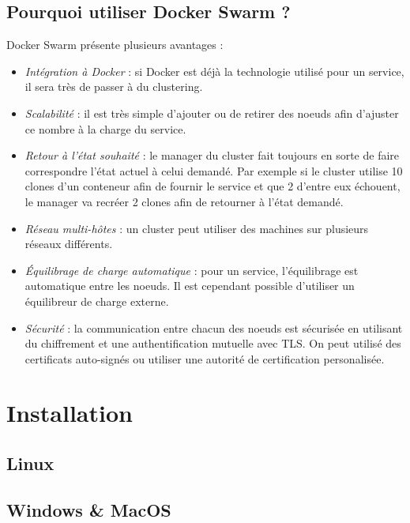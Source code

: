 \section{Pourquoi utiliser Docker Swarm ?}

Docker Swarm présente plusieurs avantages :
\begin{itemize}
    \item \emph{Intégration à Docker} : si Docker est déjà la technologie utilisé pour un service,
        il sera très de passer à du clustering.

    \item \emph{Scalabilité} : il est très simple d'ajouter ou de retirer des noeuds afin d'ajuster
        ce nombre à la charge du service.

    \item \emph{Retour à l'état souhaité} : le manager du cluster fait toujours en sorte de faire
        correspondre l'état actuel à celui demandé. Par exemple si le cluster utilise 10 clones
        d'un conteneur afin de fournir le service et que 2 d'entre eux échouent, le manager va
        recréer 2 clones afin de retourner à l'état demandé.

    \item \emph{Réseau multi-hôtes} : un cluster peut utiliser des machines sur plusieurs réseaux
        différents.

    \item \emph{Équilibrage de charge automatique} : pour un service, l'équilibrage est automatique
        entre les noeuds. Il est cependant possible d'utiliser un équilibreur de charge externe.
    
    \item \emph{Sécurité} : la communication entre chacun des noeuds est sécurisée en utilisant
        du chiffrement et une authentification mutuelle avec TLS. On peut utilisé des certificats
        auto-signés ou utiliser une autorité de certification personalisée.
\end{itemize}

\chapter{Installation}

\section{Linux}

\section{Windows \& MacOS}

